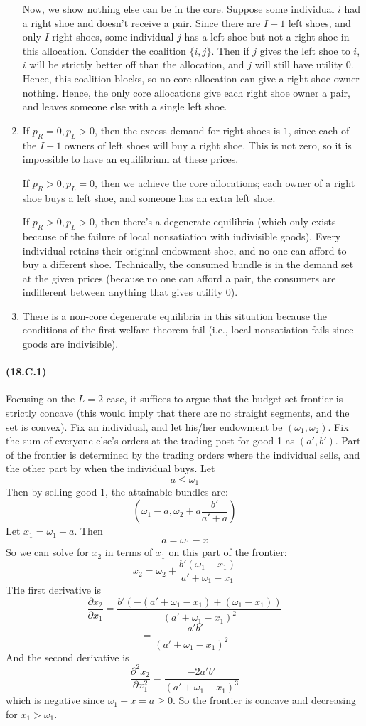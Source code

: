 \documentclass[10pt,letter]{article}
\begin{document}
\begin{enumerate}[label=(\alph*)]
  Now, we show nothing else can be in the core. Suppose some individual $i$ had a right shoe and doesn't receive a pair. Since there are $I+1$ left shoes, and only $I$ right shoes, some individual $j$ has a left shoe but not a right shoe in this allocation. Consider the coalition $\{ i, j\}$. Then if $j$ gives the left shoe to $i$, $i$ will be strictly better off than the allocation, and $j$ will still have utility 0. Hence, this coalition blocks, so no core allocation can give a right shoe owner nothing. Hence, the only core allocations give each right shoe owner a pair, and leaves someone else with a single left shoe.
  \item If $p_R = 0, p_L > 0$, then the excess demand for right shoes is $1$, since each of the $I+1$ owners of left shoes will buy a right shoe. This is not zero, so it is impossible to have an equilibrium at these prices.

  If $p_R > 0, p_L = 0$, then we achieve the core allocations; each owner of a right shoe buys a left shoe, and someone has an extra left shoe.

  If $p_R > 0, p_L > 0$, then there's a degenerate equilibria (which only exists because of the failure of local nonsatiation with indivisible goods). Every individual retains their original endowment shoe, and no one can afford to buy a different shoe. Technically, the consumed bundle is in the demand set at the given prices (because no one can afford a pair, the consumers are indifferent between anything that gives utility 0).
  \item There is a non-core degenerate equilibria in this situation because the conditions of the first welfare theorem fail (i.e., local nonsatiation fails since goods are indivisible).
\end{enumerate}
\paragraph{(18.C.1)}
Focusing on the $L=2$ case, it suffices to argue that the budget set frontier is strictly concave (this would imply that there are no straight segments, and the set is convex). Fix an individual, and let his/her endowment be $(\omega_1, \omega_2)$. Fix the sum of everyone else's orders at the trading post for good 1 as $(a', b')$. Part of the frontier is determined by the trading orders where the individual sells, and the other part by when the individual buys. Let
\[ a \le \omega_1 \]
Then by selling good 1, the attainable bundles are:
\[ \left(\omega_1 - a , \omega_2 + a\frac{b'}{a' + a} \right) \]
Let $x_1 = \omega_1 - a$. Then
\[ a = \omega_1 - x  \]
So we can solve for $x_2$ in terms of $x_1$ on this part of the frontier:
\[ x_2 = \omega_2 + \frac{b' (\omega_1 - x_1)}{a' + \omega_1 - x_1} \]
THe first derivative is
\[ \frac{\partial x_2 }{\partial x_1} = \frac{b' \left( -(a' + \omega_1 - x_1) + (\omega_1 - x_1) \right)}{(a'+ \omega_1 - x_1)^2} \]
\[  = \frac{ -a'b'}{(a' + \omega_1 - x_1 )^2} \]
And the second derivative is
\[ \frac{\partial^2 x_2 }{\partial x_1^2} = \frac{ -2 a'b'}{(a' + \omega_1 - x_1 )^3} \]
which is negative since $\omega_1 - x = a \ge 0$. So the frontier is concave and decreasing for $x_1 > \omega_1$.
\end{document}
